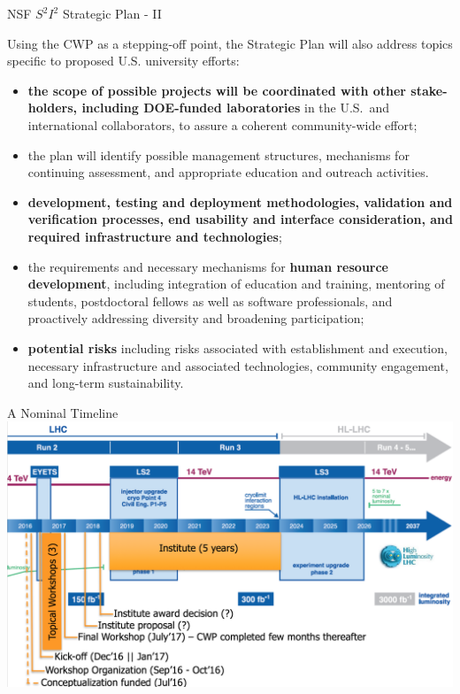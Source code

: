 \documentclass[compress,10]{beamer}
\begin{document}
\begin{frame}[fragile]{NSF $S^2 I^2 $ Strategic Plan - II }{}
{\footnotesize
Using the CWP as a stepping-off point, the Strategic Plan will also address
topics specific to proposed U.S. university efforts:
\begin{itemize}
 \item
  \textcolor{brickred}{\bf
  the scope of possible projects will be coordinated with
  other stake-holders, including DOE-funded laboratories}
  in the U.S.\ and international collaborators,
  to assure a coherent community-wide effort;
 \item
  the plan will identify possible management structures,
  mechanisms for continuing assessment,
  and appropriate education and outreach activities.
 \item
  \textcolor{brickred}{\bf
   development, testing and deployment
   methodologies, validation and verification processes,
   end usability and interface consideration,
   and required infrastructure and technologies};
 \item
   the requirements and necessary mechanisms for 
  \textcolor{brickred}{\bf human resource development},
   including integration
   of education and training, mentoring of students, postdoctoral fellows
   as well as
   software professionals, and proactively addressing diversity and
   broadening participation;
 \item
   \textcolor{brickred}{\bf
    potential risks} including risks associated with establishment and
   execution, necessary infrastructure
   and associated technologies, community engagement, and long-term
   sustainability.
\end{itemize}
}  %

\end{frame}

\begin{frame}{A Nominal Timeline}{}
{\footnotesize
\includegraphics[width=1.0\textwidth]{S2I2_timeline.png}
}  %

\end{frame}
\end{document}
